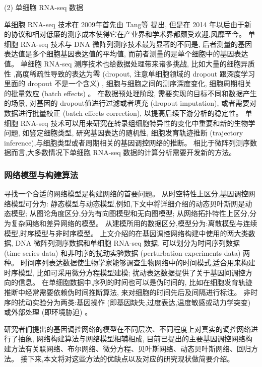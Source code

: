 (2) 单细胞 RNA-seq 数据

单细胞 RNA-seq 技术在 2009年首先由 Tang等 提出,
但是在 2014 年以后由于新的协议和相对低廉的测序成本使得它在产业界和学术界都颇受欢迎,风靡至今。
单细胞 RNA-seq 技术与 DNA 微阵列测序技术最为显著的不同是,
后者测量的基因表达值是多个细胞基因表达值的平均值,
而前者测量的是单个细胞中的基因表达值。
单细胞 RNA-seq 测序技术也给数据处理带来诸多挑战,
比如大量的细胞异质性 ,高度稀疏性导致的表达为零 (dropout, 注意单细胞领域的 dropout 跟深度学习里面的 dropout 不是一个含义) , 细胞与细胞之间的测序深度变化, 细胞周期相关的批量效应 (batch effects) 。
在数据预处理阶段, 需要实现的目标不同和数据产生的场景, 对基因的 dropout值进行过滤或者填充 (dropout imputation), 或者需要对数据进行批量校正 (batch effects correction), 以提高后续下游分析的稳定性。
单细胞 RNA-seq 技术可以用来研究在转录组细胞特异性的变化中重要和新的生物学问题,
如鉴定细胞类型, 研究基因表达的随机性, 细胞发育轨迹推断 (trajectory inference),与细胞类型或者周期相关的基因调控网络的推断。
相比于微阵列测序数据而言,大多数情况下单细胞 RNA-seq 数据的计算分析需要开发新的方法。

\subsubsection{网络模型与构建算法}

寻找一个合适的网络模型是构建网络的首要问题。
从时空特性上区分,基因调控网络模型可分为:
静态模型与动态模型,例如,下文中将详细介绍的动态贝叶斯网是动态模型;
从图论角度区分,分为有向图模型和无向图模型;
从网络拓扑特性上区分,分为复杂网络和差异网络的模型。 
从建模所用的数据区分,模型分为:离散模型与连续模型,时序模型与非时序模型。
上文介绍的在基因调控网络构建中使用的两大类数据, DNA 微阵列测序数据和单细胞 RNA-seq 数据, 
可以划分为时间序列数据 (time series data) 和非时序的扰动实验数据 (perturbation experiments data) 两种。
时间序列表达数据使生物学家能够调查生物网络中的时间模式,适合用来构建时序模型, 比如可采用微分方程模型建模; 
扰动表达数据提供了关于基因间调控方向的信息。
在单细胞数据中,序列的时间也可以是伪时间的, 比如在细胞发育轨迹推断中经常需要依赖伪时间推断算法, 来对细胞的时间先后及间隔进行标注。
非时序的扰动实验分为两类:基因操作 (即基因缺失,过度表达,温度敏感或动力学突变)  或外部处理 (即环境胁迫) 。


研究者们提出的基因调控网络的模型在不同层次、不同程度上对真实的调控网络进行了抽象,
网络构建算法与网络模型相辅相成,
目前已提出的主要基因调控网络构建方法有关联网络、布尔网络、微分方程、贝叶斯网络、动态贝叶斯网络、回归方法。
接下来,本文将对这些方法的优缺点以及对应的研究现状做简要介绍。

